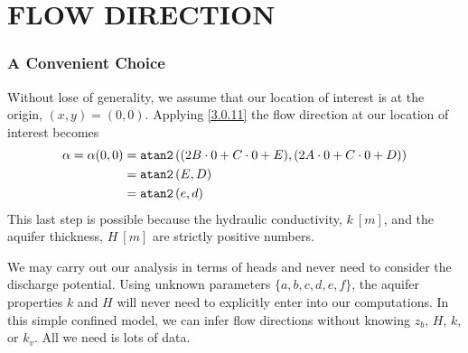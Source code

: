 \documentclass[12pt]{report}
\begin{document}
\chapter{FLOW DIRECTION}
\subsection{A Convenient Choice}
Without lose of generality, we assume that our location of interest is at the origin, $(x,y) = (0,0)$.  Applying \eqref{3.0.11} the flow direction at our location of interest becomes
%
\begin{align}\label{6.0.1}
    \alpha = \alpha(0,0)
    &= \text{\tt atan2}\left((2B \cdot 0 + C \cdot 0 + E), (2A \cdot 0 + C \cdot 0 + D)\right) \nonumber\\
    &= \text{\tt atan2}\left(E, D\right) \nonumber\\
    &= \text{\tt atan2}\left(e, d\right)
\end{align}
%
This last step is possible because the hydraulic conductivity, $k~[m]$, and the aquifer thickness, $H~[m]$ are strictly positive numbers.

We may carry out our analysis in terms of heads and never need to consider the discharge potential.  Using unknown parameters $\{a, b, c, d, e, f \}$, the aquifer properties $k$ and $H$ will never need to explicitly enter into our computations.  In this simple confined model, we can infer flow directions without knowing $z_b$, $H$, $k$, or $k_v$. All we need is lots of data.

\end{document}
